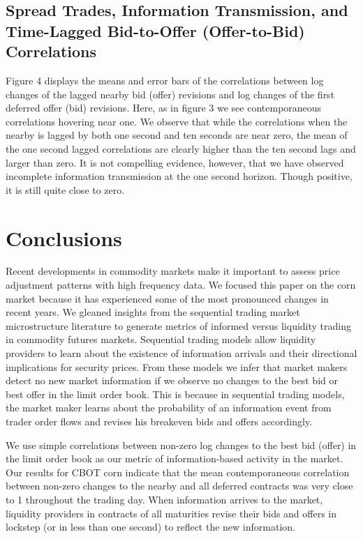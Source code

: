 \documentclass[]{elsarticle} %
\begin{document}
\subsection{Spread Trades, Information Transmission, and Time-Lagged
Bid-to-Offer (Offer-to-Bid)
Correlations}\label{spread-trades-information-transmission-and-time-lagged-bid-to-offer-offer-to-bid-correlations-1}

Figure 4 displays the means and error bars of the correlations between
log changes of the lagged nearby bid (offer) revisions and log changes
of the first deferred offer (bid) revisions. Here, as in figure 3 we see
contemporaneous correlations hovering near one. We observe that while
the correlations when the nearby is lagged by both one second and ten
seconds are near zero, the mean of the one second lagged correlations
are clearly higher than the ten second lags and larger than zero. It is
not compelling evidence, however, that we have observed incomplete
information transmission at the one second horizon. Though positive, it
is still quite close to zero.

\section{Conclusions}\label{conclusions}

Recent developments in commodity markets make it important to assess
price adjustment patterns with high frequency data. We focused this
paper on the corn market because it has experienced some of the most
pronounced changes in recent years. We gleaned insights from the
sequential trading market microstructure literature to generate metrics
of informed versus liquidity trading in commodity futures markets.
Sequential trading models allow liquidity providers to learn about the
existence of information arrivals and their directional implications for
security prices. From these models we infer that market makers detect no
new market information if we observe no changes to the best bid or best
offer in the limit order book. This is because in sequential trading
models, the market maker learns about the probability of an information
event from trader order flows and revises his breakeven bids and offers
accordingly.

We use simple correlations between non-zero log changes to the best bid
(offer) in the limit order book as our metric of information-based
activity in the market. Our results for CBOT corn indicate that the mean
contemporaneous correlation between non-zero changes to the nearby and
all deferred contracts was very close to 1 throughout the trading day.
When information arrives to the market, liquidity providers in contracts
of all maturities revise their bids and offers in lockstep (or in less
than one second) to reflect the new information.
\end{document}

